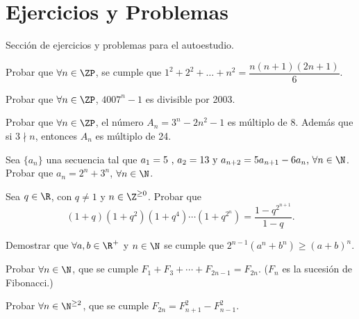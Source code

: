 \section{Ejercicios y Problemas}
{
    Sección de ejercicios y problemas para el autoestudio.

    \begin{section-problem}
        Probar que $\forall n \in \ZP$, se cumple que $1^2 + 2^2 + \dots + n^2 = \dfrac{n(n+1)(2n+1)}{6}$.
    \end{section-problem}

    \begin{section-problem}
        Probar que $\forall n\in \ZP$, $4007^n - 1$ es divisible por 2003.
    \end{section-problem}

    \begin{section-problem}
        Probar que $\forall n \in \ZP$, el número $A_n = 3^n - 2n^2 - 1$ es múltiplo de $8$.
        Además que si $3\nmid n$, entonces $A_n$ es múltiplo de 24.
    \end{section-problem}

    \begin{section-problem}
        Sea $\{a_n\}$ una secuencia tal que $a_1 = 5 \mbox{ , } a_2 = 13 \mbox{ y } a_{n+2}=5a_{n+1}-6a_n \mbox{, } \forall n \in \N$.
        Probar que $a_n = 2^n+3^n$, $\forall n \in \N$.
    \end{section-problem}

    \begin{section-problem}
        Sea $q \in \R$, con $q \neq 1$ y $n \in \Z^{\geq 0}$.
        Probar que
        \[(1 + q)(1 + q^2)(1 + q^4)\cdots(1 + q^{2^n}) = \frac{1 - q^{2^{n + 1}} }{1 - q}.\]
    \end{section-problem}

    \begin{section-problem}
        Demostrar que $\forall a, b\in \R^+$ y $n \in \N$ se cumple que $2^{n - 1}(a^n + b^n) \geq (a + b)^n.$
    \end{section-problem}

    \begin{section-problem}
        Probar $\forall n \in \N$, que se cumple $F_1 + F_3 + \cdots + F_{2n - 1} = F_{2n}.$ ($F_n$ es la sucesión de Fibonacci.)
    \end{section-problem}

    \begin{section-problem}
        Probar $\forall n \in \N^{\geq 2}$, que se cumple $F_{2n} = F_{n + 1}^2 - F_{n - 1}^2.$
    \end{section-problem}
}